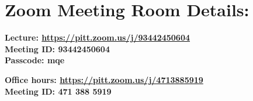 \documentclass[a4paper, 10pt]{article}
\begin{document}
\section*{Zoom Meeting Room Details:}



\noindent\textbf{Lecture: \href{ https://pitt.zoom.us/j/93442450604}{ https://pitt.zoom.us/j/93442450604}\\
Meeting ID:  93442450604\\
Passcode: mqe\\}



\noindent\textbf{Office hours: \href{https://pitt.zoom.us/j/4713885919}{https://pitt.zoom.us/j/4713885919}\\
Meeting ID: 471 388 5919\\}





\
\end{document}
